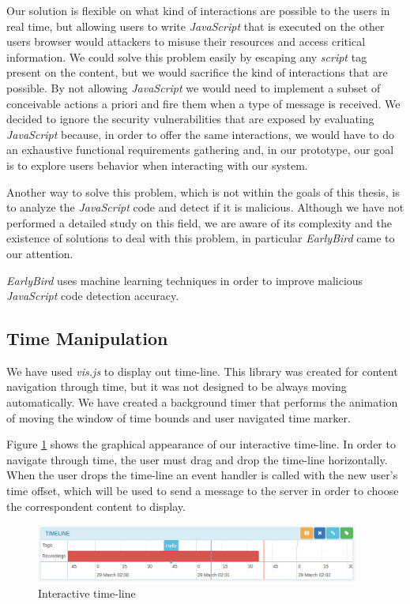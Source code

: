 	Our solution is flexible on what kind of interactions are possible to the users in real time, but allowing users to write \emph{JavaScript} that is executed on the other users browser would attackers to misuse their resources and access critical information. We could solve this problem easily by escaping any \emph{script} tag present on the content, but we would sacrifice the kind of interactions that are possible. By not allowing \emph{JavaScript} we would need to implement a subset of conceivable actions a priori and fire them when a type of message is received. We decided to ignore the security vulnerabilities that are exposed by evaluating \emph{JavaScript} because, in order to offer the same interactions, we would have to do an exhaustive functional requirements gathering and, in our prototype, our goal is to explore users behavior when interacting with our system. 

	Another way to solve this problem, which is not within the goals of this thesis, is to analyze the \emph{JavaScript} code and detect if it is malicious. Although we have not performed a detailed study on this field, we are aware of its complexity and the existence of solutions to deal with this problem, in particular \emph{EarlyBird}\cite{earlybird} came to our attention. 

\emph{EarlyBird} uses machine learning techniques in order to improve malicious \emph{JavaScript} code detection accuracy.


	\subsection{Time Manipulation}

	We have used \emph{vis.js} to display out time-line. This library was created for content navigation through time, but it was not designed to be always moving automatically. We have created a background timer that performs the animation of moving the window of time bounds and user navigated time marker.

	Figure \ref{fig:timeline} shows the graphical appearance of our interactive time-line. In order to navigate through time, the user must drag and drop the time-line horizontally. When the user drops the time-line an event handler is called with the new user's time offset, which will be used to send a message to the server in order to choose the correspondent content to display. 

	\begin{figure}
		\centering
		\includegraphics[width=0.95\textwidth]{figures/timeline.png}
		\caption{Interactive time-line}
		\label{fig:timeline}
	\end{figure}


